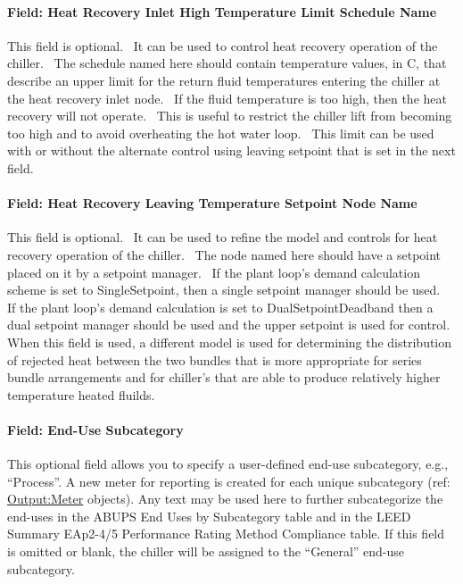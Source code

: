 \paragraph{Field: Heat Recovery Inlet High Temperature Limit Schedule Name}\label{field-heat-recovery-inlet-high-temperature-limit-schedule-name-1}

This field is optional.~ It can be used to control heat recovery operation of the chiller.~ The schedule named here should contain temperature values, in C, that describe an upper limit for the return fluid temperatures entering the chiller at the heat recovery inlet node.~ If the fluid temperature is too high, then the heat recovery will not operate.~ This is useful to restrict the chiller lift from becoming too high and to avoid overheating the hot water loop.~ This limit can be used with or without the alternate control using leaving setpoint that is set in the next field.

\paragraph{Field: Heat Recovery Leaving Temperature Setpoint Node Name}\label{field-heat-recovery-leaving-temperature-setpoint-node-name-1}

This field is optional.~ It can be used to refine the model and controls for heat recovery operation of the chiller.~ The node named here should have a setpoint placed on it by a setpoint manager.~ If the plant loop's demand calculation scheme is set to SingleSetpoint, then a single setpoint manager should be used.~ If the plant loop's demand calculation is set to DualSetpointDeadband then a dual setpoint manager should be used and the upper setpoint is used for control.~ When this field is used, a different model is used for determining the distribution of rejected heat between the two bundles that is more appropriate for series bundle arrangements and for chiller's that are able to produce relatively higher temperature heated fluilds.

\paragraph{Field: End-Use Subcategory}

This optional field allows you to specify a user-defined end-use subcategory, e.g., ``Process''. A new meter for reporting is created for each unique subcategory (ref: \hyperref[outputmeter-and-outputmetermeterfileonly]{Output:Meter} objects). Any text may be used here to further subcategorize the end-uses in the ABUPS End Uses by Subcategory table and in the LEED Summary EAp2-4/5 Performance Rating Method Compliance table. If this field is omitted or blank, the chiller will be assigned to the ``General'' end-use subcategory.

